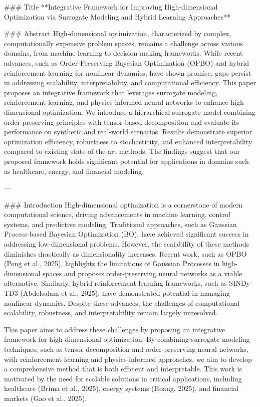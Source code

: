 ### Title  
**Integrative Framework for Improving High-dimensional Optimization via Surrogate Modeling and Hybrid Learning Approaches**

### Abstract  
High-dimensional optimization, characterized by complex, computationally expensive problem spaces, remains a challenge across various domains, from machine learning to decision-making frameworks. While recent advances, such as Order-Preserving Bayesian Optimization (OPBO) and hybrid reinforcement learning for nonlinear dynamics, have shown promise, gaps persist in addressing scalability, interpretability, and computational efficiency. This paper proposes an integrative framework that leverages surrogate modeling, reinforcement learning, and physics-informed neural networks to enhance high-dimensional optimization. We introduce a hierarchical surrogate model combining order-preserving principles with tensor-based decomposition and evaluate its performance on synthetic and real-world scenarios. Results demonstrate superior optimization efficiency, robustness to stochasticity, and enhanced interpretability compared to existing state-of-the-art methods. The findings suggest that our proposed framework holds significant potential for applications in domains such as healthcare, energy, and financial modeling.

---

### Introduction  
High-dimensional optimization is a cornerstone of modern computational science, driving advancements in machine learning, control systems, and predictive modeling. Traditional approaches, such as Gaussian Process-based Bayesian Optimization (BO), have achieved significant success in addressing low-dimensional problems. However, the scalability of these methods diminishes drastically as dimensionality increases. Recent work, such as OPBO (Peng et al., 2025), highlights the limitations of Gaussian Processes in high-dimensional spaces and proposes order-preserving neural networks as a viable alternative. Similarly, hybrid reinforcement learning frameworks, such as SINDy-TD3 (Abdelsalam et al., 2025), have demonstrated potential in managing nonlinear dynamics. Despite these advances, the challenges of computational scalability, robustness, and interpretability remain largely unresolved.

This paper aims to address these challenges by proposing an integrative framework for high-dimensional optimization. By combining surrogate modeling techniques, such as tensor decomposition and order-preserving neural networks, with reinforcement learning and physics-informed approaches, we aim to develop a comprehensive method that is both efficient and interpretable. This work is motivated by the need for scalable solutions in critical applications, including healthcare (Brima et al., 2025), energy systems (Hoang, 2025), and financial markets (Gao et al., 2025).

